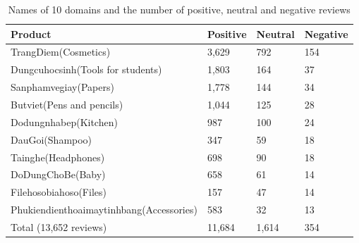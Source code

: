 \begin{table}[htb]
\centering
\caption{Names of 10 domains and the number of positive, neutral and negative reviews}
\begin{tabular}{|L{5cm}|R{1.5cm}|R{1.5cm}|R{1.5cm}|}%
	\hline
	\textbf{Product} &  \textbf{Positive} & \textbf{Neutral} & \textbf{Negative}  \\
	\hline
	TrangDiem(Cosmetics) &	3,629&	792&	154\\
	Dungcuhocsinh(Tools for students) &	1,803&	164&	37\\
	Sanphamvegiay(Papers) &	1,778&	144&	34\\
	Butviet(Pens and pencils) &	1,044&	125&	28\\		
	Dodungnhabep(Kitchen) &	987 &	100&	24\\		
	DauGoi(Shampoo) &	347 &	59&	18\\
	Tainghe(Headphones) &	698&	90&	18\\
	DoDungChoBe(Baby)	&658	&61	&14\\
	Filehosobiahoso(Files)	&157	&47	&14\\
	Phukiendienthoaimaytinhbang(Accessories)	&583	&32	&13\\
	\hline
	Total (13,652 reviews) & 11,684 &	1,614 &	354	 \\
	\hline
\end{tabular}

\label{table:Table CRSAVi}
\end{table}

